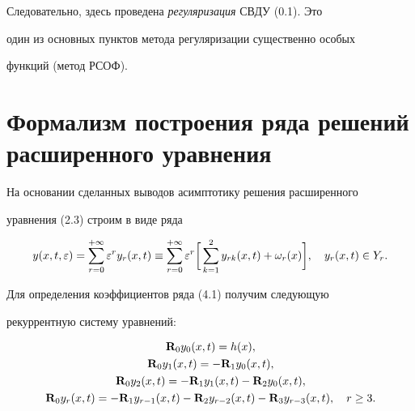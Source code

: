 Следовательно, здесь проведена {\it регуляризация} СВДУ (0.1). Это


один из основных пунктов метода регуляризации существенно особых


функций (метод РСОФ).








\section{Формализм построения ряда решений расширенного уравнения}





На основании сделанных выводов асимптотику решения расширенного


уравнения (2.3) строим в виде ряда


\begin{equation}


y (x, t, \e) = \sum \limits_{r=0}^{+\infty} \e^r y_r (x, t) \equiv


\sum \limits_{r=0}^{+\infty} \e^r \bigg[ \sum \limits_{k=1}^{2}


y_{rk} (x, t) + \omega_r (x) \bigg], \quad y_r (x,t) \in Y_r.


\end{equation}





Для определения коэффициентов ряда (4.1) получим следующую


рекуррентную систему уравнений:


\begin{gather}


\bold{R}_0 y_0 (x, t) = h(x), \\


\bold{R}_0 y_1 (x, t) = - \bold{R}_1 y_0 (x, t), \\


\bold{R}_0 y_2 (x, t) = - \bold{R}_1 y_{1} (x, t) -


\bold{R}_2 y_{0} (x, t),\notag \\


\bold{R}_0 y_r (x, t) = - \bold{R}_1 y_{r-1} (x, t) -


\bold{R}_2 y_{r-2} (x, t) - \bold{R}_3 y_{r-3} (x, t), \quad r \geq 3. 


\end{gather}








